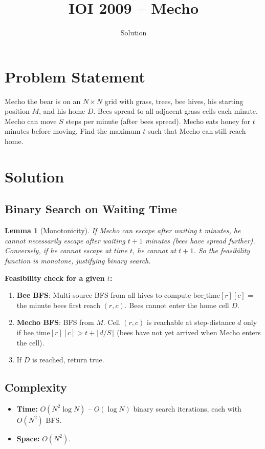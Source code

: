 \documentclass[11pt,a4paper]{article}
\title{IOI 2009 -- Mecho}
\author{Solution}
\date{}
\newtheorem{lemma}[theorem]{Lemma}
\begin{document}
\maketitle

\section{Problem Statement}
Mecho the bear is on an $N \times N$ grid with grass, trees, bee hives, his starting position $M$, and his home $D$. Bees spread to all adjacent grass cells each minute. Mecho can move $S$ steps per minute (after bees spread). Mecho eats honey for $t$ minutes before moving. Find the maximum $t$ such that Mecho can still reach home.

\section{Solution}

\subsection{Binary Search on Waiting Time}
\begin{lemma}[Monotonicity]
If Mecho can escape after waiting $t$ minutes, he cannot necessarily escape after waiting $t+1$ minutes (bees have spread further). Conversely, if he cannot escape at time $t$, he cannot at $t+1$. So the feasibility function is monotone, justifying binary search.
\end{lemma}

\textbf{Feasibility check for a given $t$:}
\begin{enumerate}
    \item \textbf{Bee BFS}: Multi-source BFS from all hives to compute $\text{bee\_time}[r][c]$ = the minute bees first reach $(r,c)$. Bees cannot enter the home cell $D$.
    \item \textbf{Mecho BFS}: BFS from $M$. Cell $(r,c)$ is reachable at step-distance $d$ only if $\text{bee\_time}[r][c] > t + \lfloor d/S \rfloor$ (bees have not yet arrived when Mecho enters the cell).
    \item If $D$ is reached, return true.
\end{enumerate}

\subsection{Complexity}
\begin{itemize}
    \item \textbf{Time:} $O(N^2 \log N)$ -- $O(\log N)$ binary search iterations, each with $O(N^2)$ BFS.
    \item \textbf{Space:} $O(N^2)$.
\end{itemize}
\end{document}
